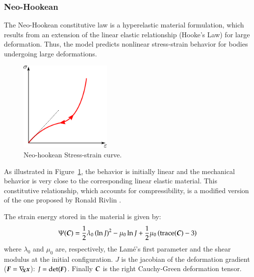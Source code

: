 
\subsubsection{Neo-Hookean}

The Neo-Hookean constitutive law is a hyperelastic material formulation, which
results from an extension of the linear elastic relationship (Hooke's Law) for
large deformation. Thus, the model predicts nonlinear stress-strain behavior for
bodies undergoing large deformations.

\begin{figure}[!htb]
  \begin{center}
    \includegraphics[width=0.4\textwidth,keepaspectratio=true]{figures/stress_strain_neo.pdf}
    \caption{Neo-hookean Stress-strain curve.}
    \label{fig:smm:cl:neo_hookean}
  \end{center}
\end{figure}

As illustrated in Figure~\ref{fig:smm:cl:neo_hookean}, the behavior is initially
linear and the mechanical behavior is very close to the corresponding linear
elastic material. This constitutive relationship, which accounts for compressibility,
 is a modified version of the one proposed by Ronald Rivlin \cite{Belytschko:2000}.

The strain energy stored in the material is given by:
\begin{equation}\label{eqn:smm:constitutive:neohookean_potential}
  \Psi(\boldsymbol{C}) = \frac{1}{2}\lambda_0\left(\ln J\right)^2-\mu_0\ln J+\frac{1}{2}
\mu_0\left(\text{trace}(\boldsymbol{C})-3\right)
\end{equation}
\noindent where $\lambda_0$ and $\mu_0$ are, respectively, the Lam\'e's first parameter
and the shear modulus at the initial configuration. $J$ is the jacobian of the deformation
gradient ($\boldsymbol{F}=\nabla_{\!\!\boldsymbol{X}}\boldsymbol{x}$): $J=\text{det}(\boldsymbol{F})$. Finally $\boldsymbol{C}$ is the right Cauchy-Green
deformation tensor.

